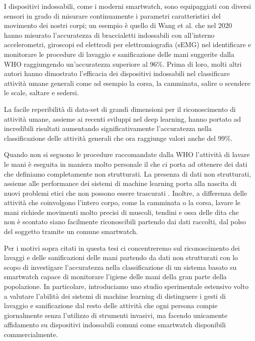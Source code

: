 I dispositivi indossabili, come i moderni smartwatch, sono equipaggiati con diversi sensori in grado di misurare continuamente i parametri caratteristici del movimento dei nostri corpi; un esempio è quello di Wang et al.\cite{wang2020accurate} che nel 2020 hanno misurato l'accuratezza di braccialetti indossabili con all'interno accelerometri, giroscopi ed elettrodi per elettromiografia (sEMG) nel identificare e monitorare le procedure di lavaggio e sanificazione delle mani suggerite dalla WHO raggiungendo un'accuratezza superiore al 96\%.
Prima di loro, molti altri autori hanno dimostrato l'efficacia dei dispositivi indossabili nel classificare attività umane generali come ad esempio la corsa, la camminata, salire o scendere le scale, saltare e sedersi\cite{zhang2013human}\cite{sztyler2016body}\cite{sztyler2017position}\cite{bhat2018online}\cite{koping2018general}\cite{lattanzi2022exploring}.

La facile reperibilità di data-set di grandi dimensioni per il riconoscimento di attività umane, assieme ai recenti sviluppi nel deep learning, hanno portato ad incredibili risultati aumentando significativamente l'accuratezza nella classificazione delle attività generali che ora raggiunge valori anche del 99\%\cite{cheng2010active}\cite{singh2017convolutional}\cite{hassan2018robust}\cite{hou2020study}.

Quando non si seguono le procedure raccomandate dalla WHO l'attività di lavare le mani è eseguita in maniera molto personale il che ci porta ad ottenere dei dati che definiamo completamente non strutturati.
La presenza di dati non strutturati, assieme alle performance dei sistemi di machine learning porta alla nascita di nuovi problemi etici che non possono essere trascurati \cite{muller2021ten}. Inoltre, a differenza delle attività che coinvolgono l'intero corpo, come la camminata o la corsa, lavare le mani richiede movimenti molto precisi di muscoli, tendini e ossa delle dita che non è scontato siano facilmente riconoscibili partendo dai dati raccolti, dal polso del soggetto tramite un comune smartwatch. 

Per i motivi sopra citati in questa tesi ci concentreremo sul riconoscimento dei lavaggi e delle sanificazioni delle mani partendo da dati non strutturati con lo scopo di investigare l'accuratezza nella 
classificazione di un sistema basato su smartwatch capace di monitorare l'igiene delle mani della gran parte della popolazione. In particolare, introduciamo uno studio sperimentale estensivo volto a valutare l'abilità dei sistemi di machine learning di distinguere i gesti di lavaggio e sanificazione dal resto delle attività che ogni persona compie giornalmente senza l'utilizzo di strumenti invasivi, ma facendo unicamente affidamento su dispositivi indossabili comuni come smartwatch disponibili commercialmente.

